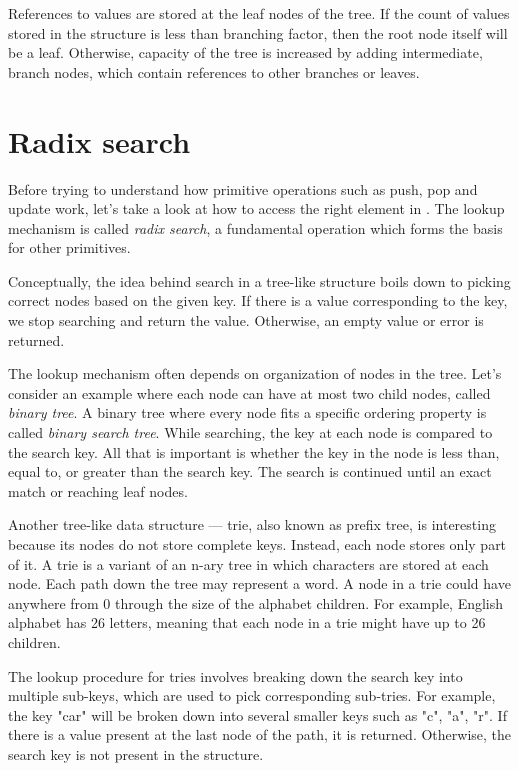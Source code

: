 References to values are stored at the leaf nodes of the tree. If the count of values stored in the structure is less than branching factor, then the root node itself will be a leaf. Otherwise, capacity of the tree is increased by adding intermediate, branch nodes, which contain references to other branches or leaves. 

\section{Radix search}

Before trying to understand how primitive operations such as push, pop and update work, let's take a look at how to access the right element in \rbtree. The lookup mechanism is called \emph{radix search}, a fundamental operation which forms the basis for other primitives.

Conceptually, the idea behind search in a tree-like structure boils down to picking correct nodes based on the given key. If there is a value corresponding to the key, we stop searching and return the value. Otherwise, an empty value or error is returned.

The lookup mechanism often depends on organization of nodes in the tree. Let's consider an example where each node can have at most two child nodes, called \emph{binary tree}. A binary tree where every node fits a specific ordering property is called \emph{binary search tree}. While searching, the key at each node is compared to the search key. All that is important is whether the key in the node is less than, equal to, or greater than the search key. The search is continued until an exact match or reaching leaf nodes.

Another tree-like data structure --- trie, also known as prefix tree, is interesting because its nodes do not store complete keys. Instead, each node stores only part of it. A trie is a variant of an n-ary tree in which characters are stored at each node. Each path down the tree may represent a word. A node in a trie could have anywhere from 0 through the size of the alphabet children. For example, English alphabet has 26 letters, meaning that each node in a trie might have up to 26 children.

The lookup procedure for tries involves breaking down the search key into multiple sub-keys, which are used to pick corresponding sub-tries. For example, the key "car" will be broken down into several smaller keys such as "c", "a", "r". If there is a value present at the last node of the path, it is returned. Otherwise, the search key is not present in the structure.

